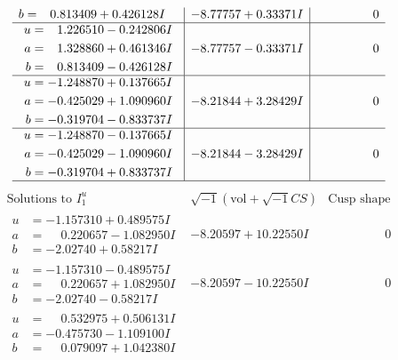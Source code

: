 \documentclass[1p]{elsarticle_modified}
\theoremstyle{definition}
\newcommand{\I}{\sqrt{-1}}
\begin{document}
$$\begin{array}{c|c|c}
\begin{aligned}
b &= \phantom{-}0.813409 + 0.426128 I\end{aligned}
 & -8.77757 + 0.33371 I & \phantom{-0.000000 } 0 \\ \hline\begin{aligned}
u &= \phantom{-}1.226510 - 0.242806 I \\
a &= \phantom{-}1.328860 + 0.461346 I \\
b &= \phantom{-}0.813409 - 0.426128 I\end{aligned}
 & -8.77757 - 0.33371 I & \phantom{-0.000000 } 0 \\ \hline\begin{aligned}
u &= -1.248870 + 0.137665 I \\
a &= -0.425029 + 1.090960 I \\
b &= -0.319704 - 0.833737 I\end{aligned}
 & -8.21844 + 3.28429 I & \phantom{-0.000000 } 0 \\ \hline\begin{aligned}
u &= -1.248870 - 0.137665 I \\
a &= -0.425029 - 1.090960 I \\
b &= -0.319704 + 0.833737 I\end{aligned}
 & -8.21844 - 3.28429 I & \phantom{-0.000000 } 0\\
 \hline 
 \end{array}$$\newpage$$\begin{array}{c|c|c}  
\text{Solutions to }I^u_{1}& \I (\text{vol} + \sqrt{-1}CS) & \text{Cusp shape}\\
 \hline 
\begin{aligned}
u &= -1.157310 + 0.489575 I \\
a &= \phantom{-}0.220657 - 1.082950 I \\
b &= -2.02740 + 0.58217 I\end{aligned}
 & -8.20597 + 10.22550 I & \phantom{-0.000000 } 0 \\ \hline\begin{aligned}
u &= -1.157310 - 0.489575 I \\
a &= \phantom{-}0.220657 + 1.082950 I \\
b &= -2.02740 - 0.58217 I\end{aligned}
 & -8.20597 - 10.22550 I & \phantom{-0.000000 } 0 \\ \hline\begin{aligned}
u &= \phantom{-}0.532975 + 0.506131 I \\
a &= -0.475730 - 1.109100 I \\
b &= \phantom{-}0.079097 + 1.042380 I\end{aligned}

\end{array}$$
\end{document}
